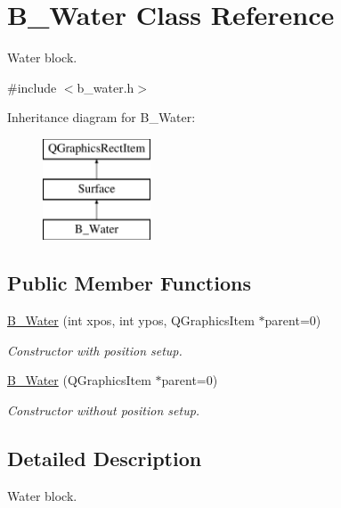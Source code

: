 \hypertarget{class_b___water}{}\section{B\+\_\+\+Water Class Reference}
\label{class_b___water}


Water block.  




{\ttfamily \#include $<$b\+\_\+water.\+h$>$}

Inheritance diagram for B\+\_\+\+Water\+:\begin{figure}[H]
\begin{center}
\leavevmode
\includegraphics[height=3.000000cm]{class_b___water}
\end{center}
\end{figure}
\subsection*{Public Member Functions}
\begin{DoxyCompactItemize}
\item 
\hyperlink{class_b___water_a6c1ef8207043a950c74583332e00bb7f}{B\+\_\+\+Water} (int xpos, int ypos, Q\+Graphics\+Item $\ast$parent=0)
\begin{DoxyCompactList}\small\item\em Constructor with position setup. \end{DoxyCompactList}\item 
\hyperlink{class_b___water_a7286659987b70322806f866c1faaf218}{B\+\_\+\+Water} (Q\+Graphics\+Item $\ast$parent=0)
\begin{DoxyCompactList}\small\item\em Constructor without position setup. \end{DoxyCompactList}\end{DoxyCompactItemize}


\subsection{Detailed Description}
Water block. 

